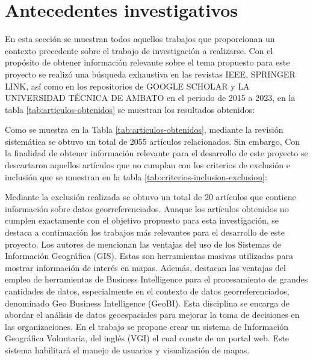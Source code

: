 \section{Antecedentes investigativos}
En esta sección se muestran todos aquellos trabajos que proporcionan un contexto
precedente sobre el trabajo de investigación a realizarse.
\bigbreak
Con el propósito de obtener información relevante sobre el tema propuesto para este proyecto se realizó una
búsqueda exhaustiva en las revistas IEEE, SPRINGER LINK, así como en los repositorios de GOOGLE SCHOLAR
y LA UNIVERSIDAD TÉCNICA DE AMBATO en el periodo de 2015 a 2023, en la tabla \ref{tab:articulos-obtenidos}
se muestran los resultados
obtenidos:

Como se muestra en la Tabla \ref{tab:articulos-obtenidos}, mediante la revisión sistemática se obtuvo un total de 2055 artículos relacionados.
Sin embargo, Con la finalidad de obtener información relevante para el desarrollo de este proyecto se descartaron
aquellos artículos que no cumplan con los criterios de exclusión e inclusión que se muestran en la tabla \ref{tab:criterios-inclusion-exclusion}:

Mediante la exclusión realizada se obtuvo un total de 20 artículos que contiene información sobre datos georreferenciados.
Aunque los artículos obtenidos no cumplen exactamente con el objetivo propuesto para esta investigación, se destaca a continuación
los trabajos más relevantes para el desarrollo de este proyecto.
\bigbreak
Los autores de \cite{herreraGeoBIBigVGI2015} mencionan las ventajas del uso de los Sistemas de Información Geográfica (GIS).
Estas son herramientas masivas utilizadas para mostrar información de interés en mapas. Además, destacan las ventajas del empleo de
herramientas de Business Intelligence para el procesamiento de grandes cantidades de datos, especialmente en el contexto de
datos georreferenciados, denominado Geo Business Intelligence (GeoBI). Esta disciplina se encarga de abordar el análisis de datos
geoespaciales para mejorar la toma de decisiones en las organizaciones. En el trabajo se propone crear un sistema de Información
Geográfica Voluntaria, del inglés (VGI) el cual conste de un portal web. Este sistema habilitará el manejo de usuarios y visualización de mapas.
